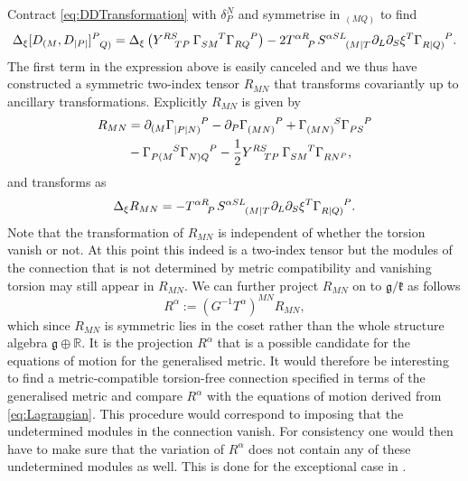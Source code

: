 Contract \eqref{eq:DDTransformation} with $\delta^N_P$ and symmetrise in $_{(MQ)}$ to find 
\begin{equation}
    \Delta_\xi [D_{(M},D_{|P|}]\tensor{}{^P_{Q)}} = \Delta_\xi \left(\tensor{Y}{^{RS}_{TP}}\tensor{\Gamma}{_{SM}^T}\tensor{\Gamma}{_{RQ}^P}\right)-2\tensor{T}{^{\alpha R}_P}\tensor{S}{^{\alpha SL}_{(M|T}}\pd_L\pd_S\xi^T\tensor{\Gamma}{_{R|Q)}^P}.
\end{equation}
The first term in the expression above is easily canceled and we thus have constructed a symmetric two-index tensor $R_{MN}$ that transforms covariantly up to ancillary transformations. Explicitly $R_{MN}$ is given by 
\begin{equation}
    \begin{aligned}
        R_{MN} &= \pd_{(M}\tensor{\Gamma}{_{|P|N)}^P}-\pd_P\tensor{\Gamma}{_{(MN)}^P}+\tensor{\Gamma}{_{(MN)}^S}\tensor{\Gamma}{_{PS}^P}\\
        &-\tensor{\Gamma}{_{P(M}^S}\tensor{\Gamma}{_{N)Q}^P}-\frac{1}{2}\tensor{Y}{^{RS}_{TP}}\tensor{\Gamma}{_{SM}^T}\tensor{\Gamma}{_{RN^P}},
    \end{aligned}
\end{equation}
and transforms as 
\begin{equation}
    \Delta_\xi R_{MN} = -\tensor{T}{^{\alpha R}_P}\tensor{S}{^{\alpha SL}_{(M|T}}\pd_L\pd_S\xi^T\tensor{\Gamma}{_{R|Q)}^P}.
\end{equation}
Note that the transformation of $R_{MN}$ is independent of whether the torsion vanish or not. At this point this indeed is a two-index tensor but the modules of the connection that is not determined by metric compatibility and vanishing torsion may still appear in $R_{MN}$. We can further project $R_{MN}$ on to $\mathfrak{g}/\mathfrak{k}$ as follows 
\begin{equation}
    R^\alpha := (G^{-1}T^\alpha)^{MN}R_{MN},
\end{equation}
which since $R_{MN}$ is symmetric lies in the coset rather than the whole structure algebra $\mathfrak{g}\oplus\mathbb{R}$. It is the projection $R^\alpha$ that is a possible candidate for the equations of motion for the generalised metric. It would therefore be interesting to find a metric-compatible torsion-free connection specified in terms of the generalised metric and compare $R^\alpha$ with the equations of motion derived from \eqref{eq:Lagrangian}. This procedure would correspond to imposing that the undetermined modules in the connection vanish. For consistency one would then have to make sure that the variation of $R^\alpha$ does not contain any of these undetermined modules as well. This is done for the exceptional case in \cite{Cederwall:2013naa}.

